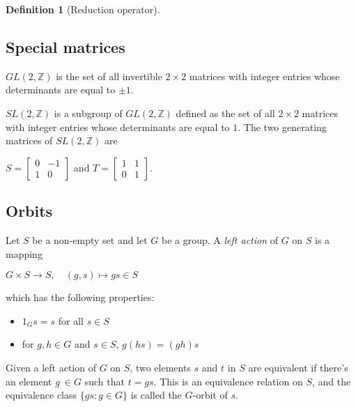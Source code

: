 \documentclass{article}
\theoremstyle{definition}
\newtheorem{definition}{Definition}[section]
\theoremstyle{theorem}
\theoremstyle{example}
\theoremstyle{corollary}
\begin{document}
\begin{definition}[Reduction operator]
\bigskip

\subsection{Special matrices}

\bigskip

\(GL(2, \mathbb{Z})\) is the set of all invertible \(2 \times 2\) matrices with integer entries whose determinants are equal to \(\pm 1\).

\bigskip

\(SL(2, \mathbb{Z})\) is a subgroup of \(GL(2, \mathbb{Z})\) defined as the set of all \(2 \times 2\) matrices with integer entries whose determinants are equal to \(1\). The two generating matrices of \(SL(2, \mathbb{Z})\) are
\begin{center}
\(S = \begin{bmatrix} 0 & -1 \\ 1 & 0 \end{bmatrix}\) \quad and \quad \(T = \begin{bmatrix} 1 & 1 \\ 0 & 1 \end{bmatrix}\).
\end{center}

\bigskip

\subsection{Orbits}

\bigskip

Let \(S\) be a non-empty set and let \(G\) be a group. A \textit{left action} of \(G\) on \(S\) is a mapping
\begin{center}
\(G \times S \rightarrow S, \quad (g, s) \mapsto gs \in S\)
\end{center}
which has the following properties:
\begin{itemize}
\item \(1_{G} s = s\) for all \(s \in S\)
\item for \(g, h \in G\) and \(s \in S\), \(g(hs) = (gh)s\)
\end{itemize}

\bigskip

Given a left action of \(G\) on \(S\), two elements \(s\) and \(t\) in \(S\) are equivalent if there's an element \(g \ \in G\) such that \(t = gs\). This is an equivalence relation on \(S\), and the equivalence class \(\{gs : g \in G \}\) is called the \(G\)-orbit of \(s\).


\end{definition}
\end{document}
